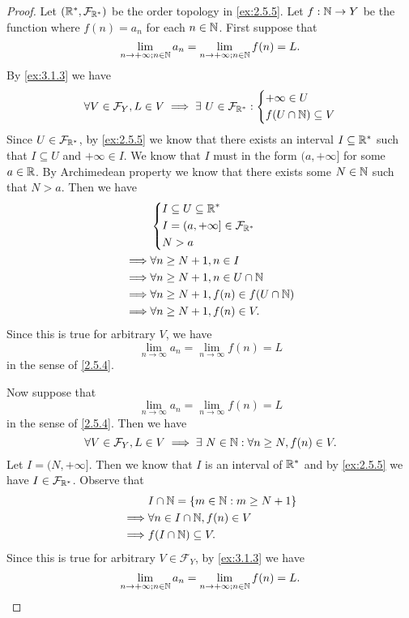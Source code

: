 \begin{proof}
  Let \((\mathbb{R}^*, \mathcal{F}_{\mathbb{R}^*})\) be the order topology in \cref{ex:2.5.5}.
  Let \(f : \mathbb{N} \to Y\) be the function where \(f(n) = a_n\) for each \(n \in \mathbb{N}\).
  First suppose that
  \[
    \lim_{n \to +\infty ; n \in \mathbb{N}} a_n = \lim_{n \to +\infty ; n \in \mathbb{N}} f(n) = L.
  \]
  By \cref{ex:3.1.3} we have
  \[
    \forall V \in \mathcal{F}_Y, L \in V \implies \exists\ U \in \mathcal{F}_{\mathbb{R}^*} : \begin{dcases}
      +\infty \in U \\
      f(U \cap \mathbb{N}) \subseteq V
    \end{dcases}
  \]
  Since \(U \in \mathcal{F}_{\mathbb{R}^*}\), by \cref{ex:2.5.5} we know that there exists an interval \(I \subseteq \mathbb{R}^*\) such that \(I \subseteq U\) and \(+\infty \in I\).
  We know that \(I\) must in the form \((a, +\infty]\) for some \(a \in \mathbb{R}\).
  By Archimedean property we know that there exists some \(N \in \mathbb{N}\) such that \(N > a\).
  Then we have
  \begin{align*}
             & \begin{dcases}
                 I \subseteq U \subseteq \mathbb{R}^*            \\
                 I = (a, +\infty] \in \mathcal{F}_{\mathbb{R}^*} \\
                 N > a
               \end{dcases}     \\
    \implies & \forall n \geq N + 1, n \in I               \\
    \implies & \forall n \geq N + 1, n \in U \cap \mathbb{N}       \\
    \implies & \forall n \geq N + 1, f(n) \in f(U \cap \mathbb{N}) \\
    \implies & \forall n \geq N + 1, f(n) \in V.
  \end{align*}
  Since this is true for arbitrary \(V\), we have
  \[
    \lim_{n \to \infty} a_n = \lim_{n \to \infty} f(n) = L
  \]
  in the sense of \cref{2.5.4}.

  Now suppose that
  \[
    \lim_{n \to \infty} a_n = \lim_{n \to \infty} f(n) = L
  \]
  in the sense of \cref{2.5.4}.
  Then we have
  \[
    \forall V \in \mathcal{F}_Y, L \in V \implies \exists\ N \in \mathbb{N} : \forall n \geq N, f(n) \in V.
  \]
  Let \(I = (N, +\infty]\).
  Then we know that \(I\) is an interval of \(\mathbb{R}^*\) and by \cref{ex:2.5.5} we have \(I \in \mathcal{F}_{\mathbb{R}^*}\).
  Observe that
  \begin{align*}
             & I \cap \mathbb{N} = \{m \in \mathbb{N} : m \geq N + 1\} \\
    \implies & \forall n \in I \cap \mathbb{N}, f(n) \in V     \\
    \implies & f(I \cap \mathbb{N}) \subseteq V.
  \end{align*}
  Since this is true for arbitrary \(V \in \mathcal{F}_Y\), by \cref{ex:3.1.3} we have
  \[
    \lim_{n \to +\infty ; n \in \mathbb{N}} a_n = \lim_{n \to +\infty ; n \in \mathbb{N}} f(n) = L.
  \]
\end{proof}

